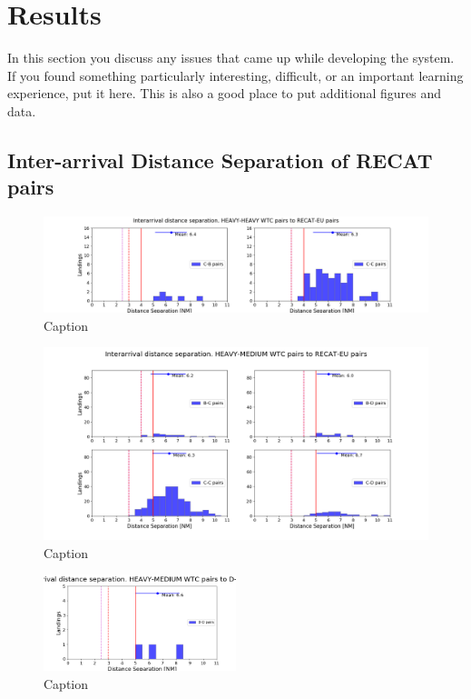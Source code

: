 \chapter{Results\label{cha:results}}

In this section you discuss any issues that came up while developing
the system.  If you found something particularly interesting,
difficult, or an important learning experience, put it here.  This is
also a good place to put additional figures and data.


\section{Inter-arrival Distance Separation of RECAT pairs}

\begin{figure}
    \centering
    \includegraphics[width=1\textwidth]{graphics/fig_HH_to_RECAT_pairs_dist_separ.png}
    \caption[list of figures caption]{Caption}
    \label{fig:HH_to_RECAT_pairs_dist_separ}
\end{figure}

\begin{figure}
    \centering
    \includegraphics[width=1\textwidth]{graphics/fig_HM_to_RECAT_pairs_dist_separ.png}
    \caption[list of figures caption]{Caption}
    \label{fig:HM_to_RECAT_pairs_dist_separ}
\end{figure}

\begin{figure}
    \centering
    \includegraphics[width=0.5\textwidth]{graphics/fig_HM_to_DD_pairs_dist_separ.png}
    \caption[list of figures caption]{Caption}
    \label{fig:HM_to_DD_pairs_dist_separ}
\end{figure}



